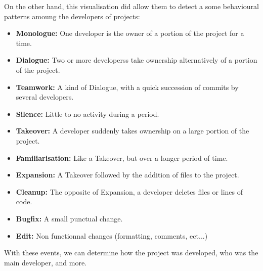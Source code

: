 On the other hand, this visualisation did allow them to detect a some behavioural patterns amoung the developers of projects:
\begin{itemize}
\item \textbf{Monologue:} One developer is the owner of a portion of the project for a time.
\item \textbf{Dialogue:} Two or more developerss take ownership alternatively of a portion of the project.
\item \textbf{Teamwork:} A kind of Dialogue, with a quick succession of commits by several developers.
\item \textbf{Silence:} Little to no activity during a period.
\item \textbf{Takeover:} A developer suddenly takes ownership on a large portion of the project.
\item \textbf{Familiarisation:} Like a Takeover, but over a longer period of time.
\item \textbf{Expansion:} A Takeover followed by the addition of files to the project.
\item \textbf{Cleanup:} The opposite of Expansion, a developer deletes files or lines of code.
\item \textbf{Bugfix:} A small punctual change.
\item \textbf{Edit:} Non functionnal changes (formatting, comments, ect...)
\end{itemize}

With these events, we can determine how the project was developed, who was the main developer, and more.